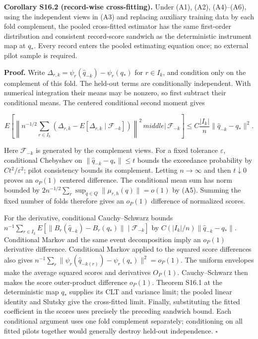 \documentclass[
  american,
  11pt,
]{article}
\begin{document}
\textbf{Corollary S16.2 (record-wise cross-fitting).} Under (A1), (A2),
(A4)--(A6), using the independent views in (A3) and replacing auxiliary
training data by each fold complement, the pooled cross-fitted estimator
has the same first-order distribution and consistent record-score
sandwich as the deterministic instrument map at \(q_*\). Every record
enters the pooled estimating equation once; no external pilot sample is
required.

\textbf{Proof.} Write
\(\Delta_{r,k}=\psi_r(\widehat q_{-k})-\psi_r(q_*)\) for \(r\in I_k\),
and condition only on the complement of this fold. The held-out terms
are conditionally independent. With numerical integration their means
may be nonzero, so first subtract their conditional means. The centered
conditional second moment gives

\[
E\left[\left\|n^{-1/2}\sum_{r\in I_k}(\Delta_{r,k}-E[\Delta_{r,k}\mid\mathcal F_{-k}])\right\|^2\,middle|\,\mathcal F_{-k}\right]
\le C\frac{|I_k|}{n}\|\widehat q_{-k}-q_*\|^2.
\]

Here \(\mathcal F_{-k}\) is generated by the complement views. For a
fixed tolerance \(\varepsilon\), conditional Chebyshev on
\(\|\widehat q_{-k}-q_*\|\le t\) bounds the exceedance probability by
\(Ct^2/\varepsilon^2\); pilot consistency bounds its complement. Letting
\(n\to\infty\) and then \(t\downarrow0\) proves an \(o_P(1)\) centered
difference. The conditional mean sum has norm bounded by
\(2n^{-1/2}\sum_r\sup_{q\in Q}\|\mu_{r,h}(q)\|=o(1)\) by (A5). Summing
the fixed number of folds therefore gives an \(o_P(1)\) difference of
normalized scores.

For the derivative, conditional Cauchy--Schwarz bounds
\(n^{-1}\sum_{r\in I_k}E[\|B_r(\widehat q_{-k})-B_r(q_*)\|\mid\mathcal F_{-k}]\)
by \(C(|I_k|/n)\|\widehat q_{-k}-q_*\|\). Conditional Markov and the
same event decomposition imply an \(o_P(1)\) derivative difference.
Conditional Markov applied to the squared score differences also gives
\(n^{-1}\sum_r\|\psi_r(\widehat q_{-k(r)})-\psi_r(q_*)\|^2=o_P(1)\). The
uniform envelopes make the average squared scores and derivatives
\(O_P(1)\). Cauchy--Schwarz then makes the score outer-product
difference \(o_P(1)\). Theorem S16.1 at the deterministic map \(q_*\)
supplies its CLT and variance limit; the pooled linear identity and
Slutsky give the cross-fitted limit. Finally, substituting the fitted
coefficient in the scores uses precisely the preceding sandwich bound.
Each conditional argument uses one fold complement separately;
conditioning on all fitted pilots together would generally destroy
held-out independence. \(\square\)
\end{document}
